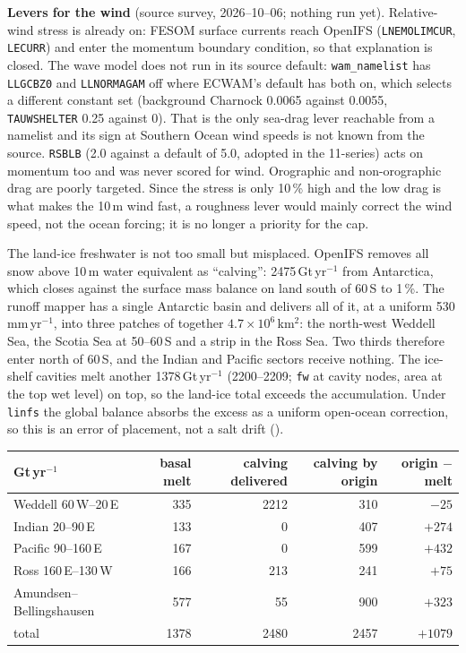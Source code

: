 \documentclass[10pt]{article}
\begin{document}
\textbf{Levers for the wind} (source survey, 2026--10--06; nothing run yet). Relative-wind stress is
already on: FESOM surface currents reach OpenIFS (\texttt{LNEMOLIMCUR}, \texttt{LECURR}) and enter the
momentum boundary condition, so that explanation is closed. The wave model does not run in its source
default: \texttt{wam\_namelist} has \texttt{LLGCBZ0} and \texttt{LLNORMAGAM} off where ECWAM's default
has both on, which selects a different constant set (background Charnock 0.0065 against 0.0055,
\texttt{TAUWSHELTER} 0.25 against 0). That is the only sea-drag lever reachable from a namelist and
its sign at Southern Ocean wind speeds is not known from the source. \texttt{RSBLB} (2.0 against a
default of 5.0, adopted in the 11-series) acts on momentum too and was never scored for wind.
Orographic and non-orographic drag are poorly targeted. Since the stress is only 10\,\% high and the
low drag is what makes the 10\,m wind fast, a roughness lever would mainly correct the wind speed, not
the ocean forcing; it is no longer a priority for the cap.

The land-ice freshwater is not too small but misplaced. OpenIFS removes all snow above 10\,m water
equivalent as ``calving'': 2475\,Gt\,yr$^{-1}$ from Antarctica, which closes against the surface mass
balance on land south of 60\,S to 1\,\%. The runoff mapper has a single Antarctic basin and delivers
all of it, at a uniform 530\,mm\,yr$^{-1}$, into three patches of together $4.7\times10^6$\,km$^2$: the
north-west Weddell Sea, the Scotia Sea at 50--60\,S and a strip in the Ross Sea. Two thirds therefore
enter north of 60\,S, and the Indian and Pacific sectors receive nothing. The ice-shelf cavities melt
another 1378\,Gt\,yr$^{-1}$ (2200--2209; \texttt{fw} at cavity nodes, area at the top wet level) on
top, so the land-ice total exceeds the accumulation. Under \texttt{linfs} the global balance absorbs
the excess as a uniform open-ocean correction, so this is an error of placement, not a salt drift
().

\begin{center}\small
\begin{tabular}{lrrrr}
\toprule
Gt\,yr$^{-1}$ & basal melt & calving delivered & calving by origin & origin $-$ melt \\
\midrule
Weddell 60\,W--20\,E & 335 & 2212 & 310 & $-25$ \\
Indian 20--90\,E & 133 & 0 & 407 & $+274$ \\
Pacific 90--160\,E & 167 & 0 & 599 & $+432$ \\
Ross 160\,E--130\,W & 166 & 213 & 241 & $+75$ \\
Amundsen--Bellingshausen & 577 & 55 & 900 & $+323$ \\
total & 1378 & 2480 & 2457 & $+1079$ \\
\bottomrule
\end{tabular}
\end{center}
\end{document}
